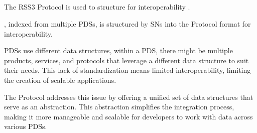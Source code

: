 \subsection{}
\label{subsec:protocol}

The RSS3 Protocol is used to structure  for interoperability \cite{protocol}.

, indexed from multiple \glspl{PDS}, is structured by \glspl{SN} into the \gls{Protocol} format for interoperability.

\glspl{PDS} use different data structures, within a \gls{PDS}, there might be multiple products, services, and protocols that leverage a different data structure to suit their needs.
This lack of standardization means limited interoperability, limiting the creation of scalable applications.

The \gls{Protocol} addresses this issue by offering a unified set of data structures that serve as an abstraction.
This abstraction simplifies the integration process, making it more manageable and scalable for developers to work with data across various \glspl{PDS}.
